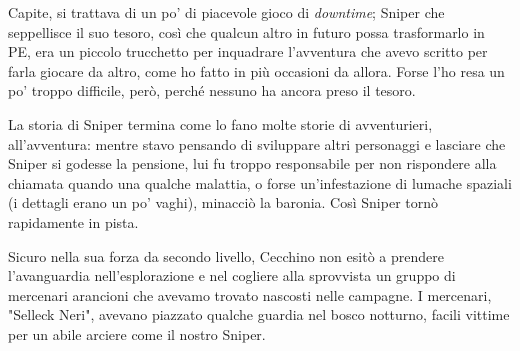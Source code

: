 Capite, si trattava di un po' di piacevole gioco di \textit{downtime}; Sniper che seppellisce il suo tesoro, così che qualcun altro in futuro possa trasformarlo in PE, era un piccolo trucchetto per inquadrare l'avventura che avevo scritto per farla giocare da altro, come ho fatto in più occasioni da allora. Forse l'ho resa un po' troppo difficile, però, perché nessuno ha ancora preso il tesoro.

La storia di Sniper termina come lo fano molte storie di avventurieri, all'avventura: mentre stavo pensando di sviluppare altri personaggi e lasciare che Sniper si godesse la pensione, lui fu troppo responsabile per non rispondere alla chiamata quando una qualche malattia, o forse un'infestazione di lumache spaziali (i dettagli erano un po' vaghi), minacciò la baronia. Così Sniper tornò rapidamente in pista.

Sicuro nella sua forza da secondo livello, Cecchino non esitò a prendere l'avanguardia nell'esplorazione e nel cogliere alla sprovvista un gruppo di mercenari arancioni che avevamo trovato nascosti nelle campagne. I mercenari, "Selleck Neri", avevano piazzato qualche guardia nel bosco notturno, facili vittime per un abile arciere come il nostro Sniper.